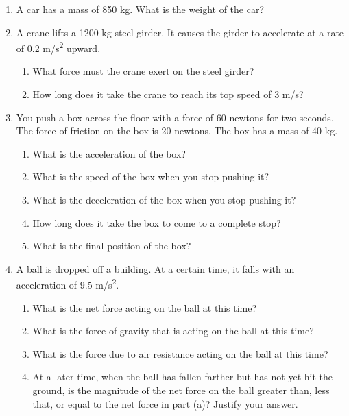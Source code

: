 \documentclass[letterpaper, 12pt]{article}
\begin{document}
\begin{enumerate}
\item A car has a mass of 850 kg.  What is the weight of the car?
\vspace{0.4in}


\item A crane lifts a 1200 kg steel girder.  It causes the girder to accelerate at a rate of 0.2 m/s\textsuperscript{2} upward. 
\begin{enumerate}
	\item What force must the crane exert on the steel girder?
	\vspace{0.4in}
	\item How long does it take the crane to reach its top speed of 3 m/s?

\end{enumerate}

\pagebreak


\item You push a box across the floor with a force of 60 newtons for two seconds.  The force of friction on the box is 20 newtons.  The box has a mass of 40 kg.  
\begin{enumerate}
	\item What is the acceleration of the box?
	\vspace{0.4in}
	\item What is the speed of the box when you stop pushing it?
	\vspace{0.4in}
	\item What is the deceleration of the box when you stop pushing it?
	\vspace{0.4in}
	\item How long does it take the box to come to a complete stop?
	\vspace{0.4in}
	\item What is the final position of the box?
	\vspace{0.4in}
\end{enumerate}

\item A ball is dropped off a building.  At a certain time, it falls with an acceleration of 9.5 m/s\textsuperscript{2}. 
	\begin{enumerate}
		\item What is the net force acting on the ball at this time?
		\vspace{0.45in}		
		\item What is the force of gravity that is acting on the ball at this time?
		\vspace{0.45in}
		\item What is the force due to air resistance acting on the ball at this time?  
		\vspace{0.45in}
		\item At a later time, when the ball has fallen farther but has not yet hit the ground, is the magnitude of the net force on the ball greater than, less that, or equal to the net force in part (a)?  Justify your answer. 
		\end{enumerate}




\end{enumerate}


 
\end{document}
